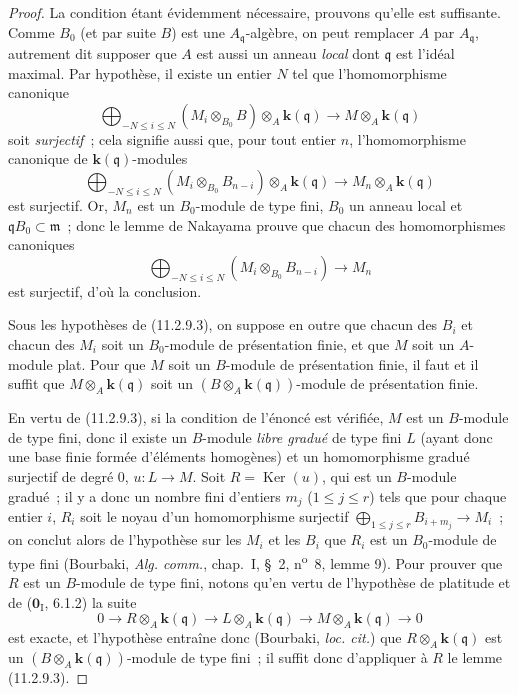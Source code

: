 \begin{proof}
La condition étant évidemment nécessaire, prouvons qu'elle est suffisante.
Comme $B_0$ (et par suite $B$) est une $A_{\mathfrak q}$-algèbre, on peut
remplacer $A$ par $A_{\mathfrak q}$, autrement dit supposer que $A$ est aussi
un anneau \emph{local} dont $\mathfrak q$ est l'idéal maximal. Par hypothèse, il existe
un entier $N$ tel que l'homomorphisme canonique
\[
\bigoplus_{-N\leq i\leq N}(M_i\otimes_{B_0}B)
\otimes_A\boldsymbol{k}(\mathfrak q)\longrightarrow M\otimes_A\boldsymbol{k}(\mathfrak q)
\]
soit \emph{surjectif}~; cela signifie aussi que, pour tout entier $n$,
l'homomorphisme canonique de $\boldsymbol{k}(\mathfrak q)$-modules
\[
\bigoplus_{-N\leq i\leq N}(M_i\otimes_{B_0}B_{n-i})
\otimes_A\boldsymbol{k}(\mathfrak q)\longrightarrow M_n\otimes_A\boldsymbol{k}(\mathfrak q)
\]
est surjectif. Or, $M_n$ est un $B_0$-module de type fini, $B_0$ un anneau
local et $\mathfrak qB_0\subset\mathfrak m$~; donc le lemme de Nakayama prouve
que chacun des homomorphismes canoniques
\[
\bigoplus_{-N\leq i\leq N}(M_i\otimes_{B_0}B_{n-i})\longrightarrow M_n
\]
est surjectif, d'où la conclusion.

\begin{corollary}[11.2.9.4]
\label{IV.11.2.9.4-fr}
Sous les hypothèses de \textup{(11.2.9.3)}, on suppose en outre que chacun des $B_i$ et
chacun des $M_i$ soit un $B_0$-module de présentation finie, et que $M$ soit
un $A$-module plat. Pour que $M$ soit un $B$-module de présentation finie, il
faut et il suffit que $M\otimes_A\boldsymbol{k}(\mathfrak q)$ soit un
$(B\otimes_A\boldsymbol{k}(\mathfrak q))$-module de présentation finie.
\end{corollary}

En vertu de (11.2.9.3), si la condition de l'énoncé est vérifiée, $M$ est un
$B$-module de type fini, donc il existe un $B$-module \emph{libre gradué} de
type fini $L$ (ayant donc une base finie formée d'éléments homogènes) et un
homomorphisme gradué surjectif de degré 0, $u:L\to M$. Soit $R=\operatorname{Ker}(u)$, qui
est un $B$-module gradué~; il y a donc un nombre fini d'entiers $m_j$
($1\leq j\leq r$) tels que pour chaque entier $i$, $R_i$ soit le noyau d'un
homomorphisme surjectif
$\bigoplus_{1\leq j\leq r}B_{i+m_j}\longrightarrow M_i$~;
on conclut alors de l'hypothèse sur les $M_i$ et les $B_i$ que $R_i$ est un
$B_0$-module de type fini (Bourbaki, \emph{Alg. comm.}, chap.~I, \S~2,
n\textsuperscript{o}~8, lemme 9). Pour prouver que $R$ est un $B$-module de type fini,
notons qu'en vertu de l'hypothèse de platitude et de
($\mathbf 0_{\mathrm I}$, 6.1.2) la suite
\[
0\longrightarrow R\otimes_A\boldsymbol{k}(\mathfrak q)
\longrightarrow L\otimes_A\boldsymbol{k}(\mathfrak q)
\longrightarrow M\otimes_A\boldsymbol{k}(\mathfrak q)\longrightarrow0
\]
est exacte, et l'hypothèse entraîne donc (Bourbaki, \emph{loc. cit.}) que
$R\otimes_A\boldsymbol{k}(\mathfrak q)$ est un $(B\otimes_A\boldsymbol{k}(\mathfrak q))$-module de type
fini~; il suffit donc d'appliquer à $R$ le lemme (11.2.9.3).


\end{proof}

